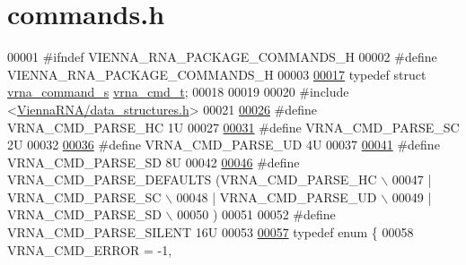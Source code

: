 \hypertarget{commands_8h_source}{}\section{commands.\+h}
\label{commands_8h_source}

\begin{DoxyCode}
00001 \textcolor{preprocessor}{#ifndef VIENNA\_RNA\_PACKAGE\_COMMANDS\_H}
00002 \textcolor{preprocessor}{#define VIENNA\_RNA\_PACKAGE\_COMMANDS\_H}
00003 
\hyperlink{group__file__utils_ga92cb3b5952352b103bcb32e5a99e0e5a}{00017} \textcolor{keyword}{typedef} \textcolor{keyword}{struct }\hyperlink{group__file__utils_structvrna__command__s}{vrna\_command\_s} \hyperlink{group__file__utils_structvrna__command__s}{vrna\_cmd\_t};
00018 
00019 
00020 \textcolor{preprocessor}{#include <\hyperlink{data__structures_8h}{ViennaRNA/data\_structures.h}>}
00021 
\hyperlink{group__file__utils_gac54dec838d7b6bebd5df85f71702d324}{00026} \textcolor{preprocessor}{#define VRNA\_CMD\_PARSE\_HC      1U}
00027 
\hyperlink{group__file__utils_ga8cad3c1f83e6f149829c49a186a83e21}{00031} \textcolor{preprocessor}{#define VRNA\_CMD\_PARSE\_SC      2U}
00032 
\hyperlink{group__file__utils_ga6c6409780698826b04ebfed9151d7649}{00036} \textcolor{preprocessor}{#define VRNA\_CMD\_PARSE\_UD      4U}
00037 
\hyperlink{group__file__utils_gaf5e20210173cdb83bf70256a454f284b}{00041} \textcolor{preprocessor}{#define VRNA\_CMD\_PARSE\_SD      8U}
00042 
\hyperlink{group__file__utils_ga0a6c88e21e366dca14958d69cd024008}{00046} \textcolor{preprocessor}{#define VRNA\_CMD\_PARSE\_DEFAULTS (VRNA\_CMD\_PARSE\_HC \(\backslash\)}
00047 \textcolor{preprocessor}{                                 | VRNA\_CMD\_PARSE\_SC \(\backslash\)}
00048 \textcolor{preprocessor}{                                 | VRNA\_CMD\_PARSE\_UD \(\backslash\)}
00049 \textcolor{preprocessor}{                                 | VRNA\_CMD\_PARSE\_SD \(\backslash\)}
00050 \textcolor{preprocessor}{                                 )}
00051 
00052 \textcolor{preprocessor}{#define VRNA\_CMD\_PARSE\_SILENT   16U}
00053 
\hyperlink{group__file__utils_ga2ea3e452bf3b3f3ca513b3b081a86137}{00057} \textcolor{keyword}{typedef} \textcolor{keyword}{enum} \{
00058   VRNA\_CMD\_ERROR  = -1,

\end{DoxyCode}
